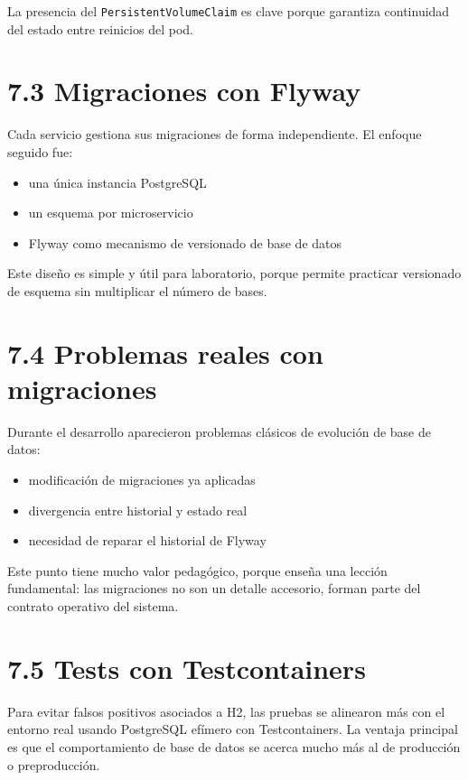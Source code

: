 \documentclass[
a4paper,
12pt]{report}
\providecommand{\tightlist}{%
  \setlength{\itemsep}{0pt}\setlength{\parskip}{0pt}}
\begin{document}
La presencia del \texttt{PersistentVolumeClaim} es clave porque
garantiza continuidad del estado entre reinicios del pod.

\section{7.3 Migraciones con Flyway}\label{migraciones-con-flyway}

Cada servicio gestiona sus migraciones de forma independiente. El
enfoque seguido fue:

\begin{itemize}
\tightlist
\item
  una única instancia PostgreSQL
\item
  un esquema por microservicio
\item
  Flyway como mecanismo de versionado de base de datos
\end{itemize}

Este diseño es simple y útil para laboratorio, porque permite practicar
versionado de esquema sin multiplicar el número de bases.

\section{7.4 Problemas reales con
migraciones}\label{problemas-reales-con-migraciones}

Durante el desarrollo aparecieron problemas clásicos de evolución de
base de datos:

\begin{itemize}
\tightlist
\item
  modificación de migraciones ya aplicadas
\item
  divergencia entre historial y estado real
\item
  necesidad de reparar el historial de Flyway
\end{itemize}

Este punto tiene mucho valor pedagógico, porque enseña una lección
fundamental: las migraciones no son un detalle accesorio, forman parte
del contrato operativo del sistema.

\section{7.5 Tests con Testcontainers}\label{tests-con-testcontainers}

Para evitar falsos positivos asociados a H2, las pruebas se alinearon
más con el entorno real usando PostgreSQL efímero con Testcontainers. La
ventaja principal es que el comportamiento de base de datos se acerca
mucho más al de producción o preproducción.
\end{document}
